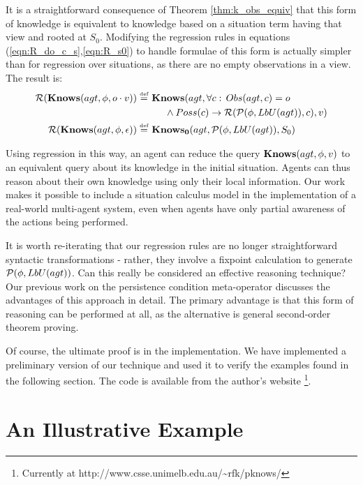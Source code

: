 It is a straightforward consequence of Theorem \ref{thm:k_obs_equiv}
that this form of knowledge is equivalent to knowledge based on a
situation term having that view and rooted at $S_{0}$. Modifying
the regression rules in equations (\ref{eqn:R_do_c_s},\ref{eqn:R_s0})
to handle formulae of this form is actually simpler than for regression
over situations, as there are no empty observations in a view. The
result is:\begin{align*}
\mathcal{R}(\mathbf{Knows}(agt,\phi,o\cdot v))\stackrel{\mbox{\tiny def}}{=}\,\, & \mathbf{Knows}(agt,\forall c:\, Obs(agt,c)=o\\
 & \,\,\,\,\,\,\,\,\wedge Poss(c)\rightarrow\mathcal{R}(\mathcal{P}(\phi,LbU(agt)),c),v)\\
\mathcal{R}(\mathbf{Knows}(agt,\phi,\epsilon))\stackrel{\mbox{\tiny def}}{=}\,\, & \mathbf{Knows_{0}}(agt,\mathcal{P}(\phi,LbU(agt)),S_{0})\end{align*}


Using regression in this way, an agent can reduce the query $\mathbf{Knows}(agt,\phi,v)$
to an equivalent query about its knowledge in the initial situation.
Agents can thus reason about their own knowledge using only their
local information. Our work makes it possible to include a situation
calculus model in the implementation of a real-world multi-agent system,
even when agents have only partial awareness of the actions being
performed.

It is worth re-iterating that our regression rules are no longer straightforward
syntactic transformations - rather, they involve a fixpoint calculation
to generate $\mathcal{P}(\phi,LbU(agt))$. Can this really be considered
an effective reasoning technique? Our previous work on the persistence
condition meta-operator \citep{kelly07sc_persistence} discusses the
advantages of this approach in detail. The primary advantage is that
this form of reasoning can be performed at all, as the alternative
is general second-order theorem proving.

Of course, the ultimate proof is in the implementation. We have implemented
a preliminary version of our technique and used it to verify the examples
found in the following section. The code is available from the author's
website%
\footnote{Currently at http://www.csse.unimelb.edu.au/\textasciitilde{}rfk/pknows/%
}.


\section{An Illustrative Example\label{sub:An-Illustrative-Example}}

